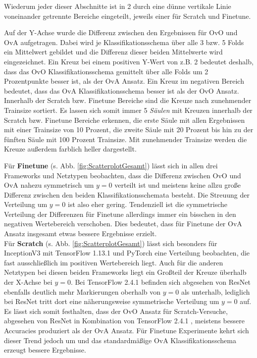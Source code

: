 Wiederum jeder dieser Abschnitte ist in 2 durch eine dünne vertikale Linie voneinander getrennte Bereiche eingeteilt, jeweils einer für Scratch und Finetune.

Auf der Y-Achse wurde die Differenz zwischen den Ergebnissen für OvO und OvA aufgetragen. Dabei wird je Klassifikationsschema über alle 3 bzw. 5 Folds ein Mittelwert gebildet und die Differenz dieser beiden Mittelwerte wird eingezeichnet. Ein Kreuz bei einem positiven Y-Wert von z.B. 2 bedeutet deshalb, dass das OvO Klassifikationsschema gemittelt über alle Folds um 2 Prozentpunkte besser ist, als der OvA Ansatz. Ein Kreuz im negativen Bereich bedeutet, dass das OvA Klassifikationsschema besser ist als der OvO Ansatz.
Innerhalb der Scratch bzw. Finetune Bereiche sind die Kreuze nach zunehmender Trainsize sortiert. Es lassen sich somit immer 5 \textit{Säulen} mit Kreuzen innerhalb der Scratch bzw. Finetune Bereiche erkennen, die erste Säule mit allen Ergebnissen mit einer Trainsize von 10 Prozent, die zweite Säule mit 20 Prozent bis hin zu der fünften Säule mit 100 Prozent Trainsize. Mit zunehmender Trainsize werden die Kreuze außerdem farblich heller dargestellt.


Für \textbf{Finetune} (s. Abb. \ref{fig:ScatterplotGesamt}) lässt sich in allen drei Frameworks und Netztypen beobachten, dass die Differenz zwischen OvO und OvA nahezu symmetrisch um $y=0$ verteilt ist und meistens keine allzu große Differenz zwischen den beiden Klassifikationsschemata besteht. Die Streuung der Verteilung um $y=0$ ist also eher gering.
Tendenziell ist die symmetrische Verteilung der Differenzen für Finetune allerdings immer ein bisschen in den negativen Wertebereich verschoben. Dies bedeutet, dass für Finetune der OvA Ansatz insgesamt etwas bessere Ergebnisse erzielt.\\

Für \textbf{Scratch} (s. Abb. \ref{fig:ScatterplotGesamt}) lässt sich besonders für InceptionV3 mit TensorFlow 1.13.1 \cite{tensorflow} und PyTorch \cite{pytorch} eine Verteilung beobachten, die fast ausschließlich im positiven Wertebereich liegt. Auch für die anderen Netztypen bei diesen beiden Frameworks liegt ein Großteil der Kreuze überhalb der X-Achse bei $y=0$. Bei TensorFlow 2.4.1 \cite{tensorflow} befinden sich abgesehen von ResNet ebenfalls deutlich mehr Markierungen oberhalb von $y=0$ als unterhalb, lediglich bei ResNet tritt dort eine näherungsweise symmetrische Verteilung um $y=0$ auf.\\

Es lässt sich somit festhalten, dass der OvO Ansatz für Scratch-Versuche, abgesehen von ResNet in Kombination von TensorFlow 2.4.1 \cite{tensorflow}, meistens bessere Accuracies produziert als der OvA Ansatz. Für Finetune Experimente kehrt sich dieser Trend jedoch um und das standardmäßige OvA Klassifikationsschema erzeugt bessere Ergebnisse.

